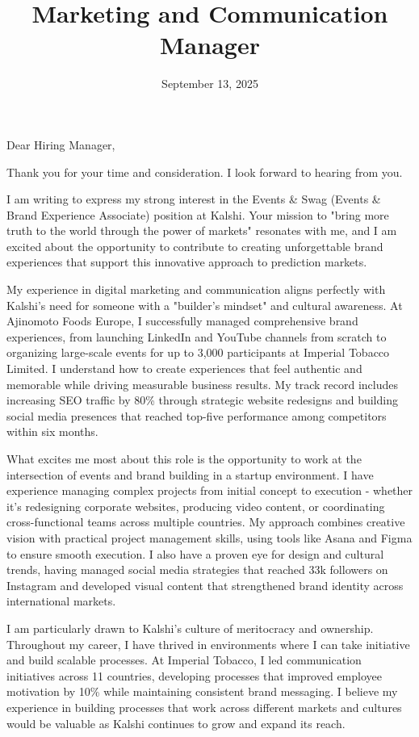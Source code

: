 \documentclass[11pt,a4paper,roman]{moderncv}        %
\title{Marketing and Communication Manager}                               %
\begin{document}
\date{September 13, 2025}
\opening{Dear Hiring Manager,}
\closing{Thank you for your time and consideration. I look forward to hearing from you.}
\makelettertitle

I am writing to express my strong interest in the Events \& Swag (Events \& Brand Experience Associate) position at Kalshi. Your mission to "bring more truth to the world through the power of markets" resonates with me, and I am excited about the opportunity to contribute to creating unforgettable brand experiences that support this innovative approach to prediction markets.

My experience in digital marketing and communication aligns perfectly with Kalshi's need for someone with a "builder's mindset" and cultural awareness. At Ajinomoto Foods Europe, I successfully managed comprehensive brand experiences, from launching LinkedIn and YouTube channels from scratch to organizing large-scale events for up to 3,000 participants at Imperial Tobacco Limited. I understand how to create experiences that feel authentic and memorable while driving measurable business results. My track record includes increasing SEO traffic by 80\% through strategic website redesigns and building social media presences that reached top-five performance among competitors within six months.

What excites me most about this role is the opportunity to work at the intersection of events and brand building in a startup environment. I have experience managing complex projects from initial concept to execution - whether it's redesigning corporate websites, producing video content, or coordinating cross-functional teams across multiple countries. My approach combines creative vision with practical project management skills, using tools like Asana and Figma to ensure smooth execution. I also have a proven eye for design and cultural trends, having managed social media strategies that reached 33k followers on Instagram and developed visual content that strengthened brand identity across international markets.

I am particularly drawn to Kalshi's culture of meritocracy and ownership. Throughout my career, I have thrived in environments where I can take initiative and build scalable processes. At Imperial Tobacco, I led communication initiatives across 11 countries, developing processes that improved employee motivation by 10\% while maintaining consistent brand messaging. I believe my experience in building processes that work across different markets and cultures would be valuable as Kalshi continues to grow and expand its reach.


\vspace{0.5cm}


\makeletterclosing
\end{document}
